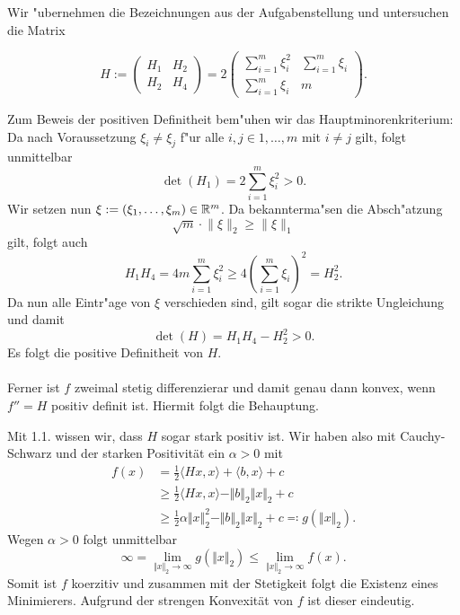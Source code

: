 Wir "ubernehmen die Bezeichnungen aus der Aufgabenstellung und untersuchen die Matrix

\[
H:=
\begin{pmatrix}
H_1 & H_2 \\ H_2 & H_4 \end{pmatrix}
= 2 \begin{pmatrix}
\sum_{i=1}^m \xi_i^2 & \sum_{i=1}^m \xi_i \\
\sum_{i=1}^m \xi_i & m
\end{pmatrix}.
\]
\begin{compactenum}[(i)]
\item Zum Beweis der positiven Definitheit
bem"uhen wir das Hauptminorenkriterium: Da
nach Voraussetzung $\xi_i \neq \xi_j$ f"ur alle $i,j \in {1,\ldots,m}$ mit $i\neq j$ gilt, folgt unmittelbar
\[
\det(H_1) = 2\sum_{i=1}^m \xi_i^2 > 0.
\]
Wir setzen nun $\xi := (\xi_1,\ldots,\xi_m)\in\mathbb{R}^m$. Da bekannterma"sen die Absch"atzung
\[
\sqrt m\cdot \lVert \xi \rVert_2 \ge \lVert \xi \rVert_1
\]
gilt, folgt auch
\[
H_1 H_4 = 4 m \sum_{i=1}^m \xi_i^2
\ge 4\left(\sum_{i=1}^m \xi_i\right)^2
= H_2^2.
\]
Da nun alle Eintr"age von $\xi$ verschieden
sind, gilt sogar die strikte Ungleichung und
damit
\[
\det(H) = H_1 H_4 - H_2^2 > 0.
\]
Es folgt die positive Definitheit von $H$. \\ \\
Ferner ist $f$ zweimal stetig differenzierar und damit genau dann konvex, wenn $f''=H$ positiv definit ist. 
Hiermit folgt die Behauptung.

 \item Mit 1.1. wissen wir, dass $H$ sogar stark positiv ist. Wir haben also mit Cauchy-Schwarz und der starken Positivität
 ein $\alpha > 0$ mit
 \begin{align*}
  f(x)&=\frac{1}{2}\langle Hx,x\rangle+\langle b, x\rangle+c\\
  &\geq\frac{1}{2}\langle Hx,x\rangle-\Vert b\Vert_2\Vert x\Vert_2+c\\
  &\geq\frac{1}{2}\alpha\Vert x\Vert_2^2-\Vert b\Vert_2\Vert x\Vert_2+c \eqqcolon g(\Vert x\Vert_2).
 \end{align*}
 Wegen $\alpha >0$ folgt unmittelbar
 \begin{displaymath}
  \infty=\lim_{\Vert x\Vert_2\to\infty}g(\Vert x\Vert_2)\leq \lim_{\Vert x\Vert_2\to\infty} f(x).
 \end{displaymath}
 Somit ist $f$ koerzitiv und zusammen mit der Stetigkeit folgt die Existenz eines Minimierers. Aufgrund der strengen Konvexität von $f$ ist dieser eindeutig.

\end{compactenum}
